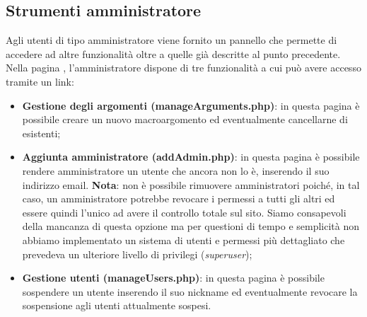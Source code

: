 \documentclass[12pt]{article}
\begin{document}
	\subsection{Strumenti amministratore}
	Agli utenti di tipo amministratore viene fornito un pannello che permette di accedere ad altre funzionalità oltre a quelle già descritte al punto precedente. Nella pagina , l'amministratore dispone di tre funzionalità a cui può avere accesso tramite un link:
	\begin{itemize}	
		\item \textbf{Gestione degli argomenti (manageArguments.php)}: in questa pagina è possibile creare un nuovo macroargomento ed eventualmente cancellarne di esistenti;
		\item \textbf{Aggiunta amministratore (addAdmin.php)}: in questa pagina è possibile rendere amministratore un utente che ancora non lo è, inserendo il suo indirizzo email. \textbf{Nota}: non è possibile rimuovere amministratori poiché, in tal caso, un amministratore potrebbe revocare i permessi a tutti gli altri ed essere quindi l'unico ad avere il controllo totale sul sito. Siamo consapevoli della mancanza di questa opzione ma per questioni di tempo e semplicità non abbiamo implementato un sistema di utenti e permessi più dettagliato che prevedeva un ulteriore livello di privilegi (\emph{superuser});
		\item \textbf{Gestione utenti (manageUsers.php)}: in questa pagina è possibile sospendere un utente inserendo il suo nickname ed eventualmente revocare la sospensione agli utenti attualmente sospesi.
	\end{itemize}
\end{document}
